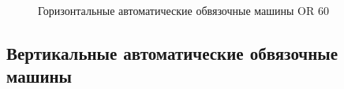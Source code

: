 \begin{figure}[ht]
    \qquad
    \qquad
    \qquad
    \caption{Горизонтальные автоматические обвязочные машины OR 60}
    \label{fig:or60}
\end{figure}

\subsection*{Вертикальные автоматические обвязочные машины}

